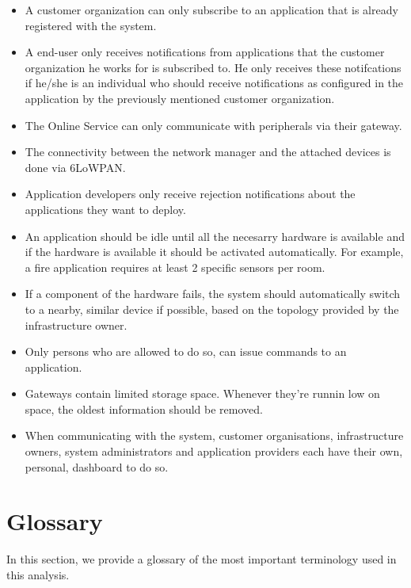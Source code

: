 \documentclass[english,peerreview]{sareport}
\begin{document}
\begin{itemize}
    \item A customer organization can only subscribe to an application that is already registered with the system.
    \item A end-user only receives notifications from applications that the customer organization he works for is subscribed to. He only receives these notifcations if he/she is an individual who should receive notifications as configured in the application by the previously mentioned customer organization.
    \item The Online Service can only communicate with peripherals via their gateway.
    \item The connectivity between the network manager and the attached devices is done via 6LoWPAN.
    \item Application developers only receive rejection notifications about the applications they want to deploy.
    \item An application should be idle until all the necesarry hardware is available and if the hardware is available it should be activated automatically. For example, a fire application requires at least 2 specific sensors per room.
    \item If a component of the hardware fails, the system should automatically switch to a nearby, similar device if possible, based on the topology provided by the infrastructure owner.
    \item Only persons who are allowed to do so, can issue commands to an application.
    \item Gateways contain limited storage space. Whenever they're runnin low on space, the oldest information should be removed.
    \item When communicating with the system, customer organisations, infrastructure owners, system administrators and application providers each have their own, personal, dashboard to do so.
\end{itemize}

\section{Glossary}
In this section, we provide a glossary of the most important terminology used
in this analysis.
\end{document}
